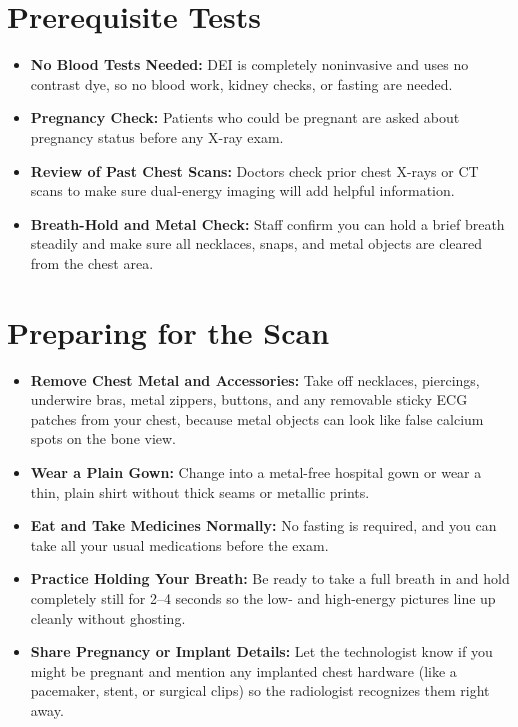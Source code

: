 \section{Prerequisite Tests}
\begin{itemize}
    \item \textbf{No Blood Tests Needed:} DEI is completely noninvasive and uses no contrast dye, so no blood work, kidney checks, or fasting are needed.
    \item \textbf{Pregnancy Check:} Patients who could be pregnant are asked about pregnancy status before any X-ray exam.
    \item \textbf{Review of Past Chest Scans:} Doctors check prior chest X-rays or CT scans to make sure dual-energy imaging will add helpful information.
    \item \textbf{Breath-Hold and Metal Check:} Staff confirm you can hold a brief breath steadily and make sure all necklaces, snaps, and metal objects are cleared from the chest area.
\end{itemize}

\section{Preparing for the Scan}
\begin{itemize}
    \item \textbf{Remove Chest Metal and Accessories:} Take off necklaces, piercings, underwire bras, metal zippers, buttons, and any removable sticky ECG patches from your chest, because metal objects can look like false calcium spots on the bone view.
    \item \textbf{Wear a Plain Gown:} Change into a metal-free hospital gown or wear a thin, plain shirt without thick seams or metallic prints.
    \item \textbf{Eat and Take Medicines Normally:} No fasting is required, and you can take all your usual medications before the exam.
    \item \textbf{Practice Holding Your Breath:} Be ready to take a full breath in and hold completely still for 2--4 seconds so the low- and high-energy pictures line up cleanly without ghosting.
    \item \textbf{Share Pregnancy or Implant Details:} Let the technologist know if you might be pregnant and mention any implanted chest hardware (like a pacemaker, stent, or surgical clips) so the radiologist recognizes them right away.
\end{itemize}

